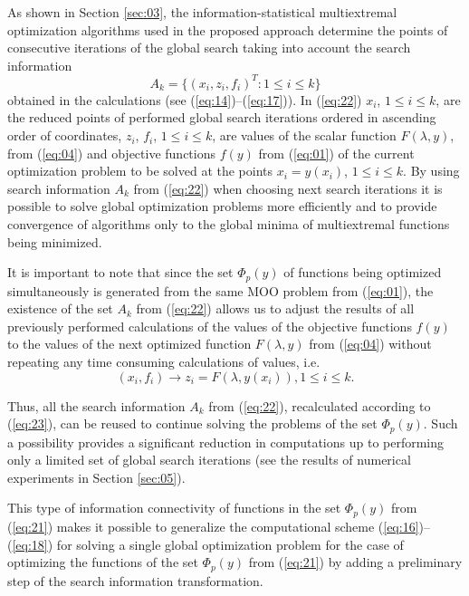 \documentclass[runningheads]{llncs}
\begin{document}
As shown in Section \ref{sec:03}, the information-statistical multiextremal optimization algorithms used in the proposed approach determine the points of consecutive iterations of the global search taking into account the search information
\begin{equation}
\label{eq:22}
A_k=\{(x_i,z_i,f_i )^T:1 \leq i \leq k\}
\end{equation}
obtained in the calculations (see (\ref{eq:14})--(\ref{eq:17})). In (\ref{eq:22}) $x_i$, $1 \leq i \leq k$,  are the reduced points of performed global search iterations ordered in ascending order of coordinates,  $z_i$, $f_i$, $1 \leq i \leq k$, are values of the scalar function $F(\lambda, y)$, from (\ref{eq:04}) and objective functions $f(y)$ from (\ref{eq:01}) of the current optimization problem to be solved at the points $x_i=y(x_i)$, $1 \leq i \leq k$. By using search information $A_k$ from (\ref{eq:22}) when choosing next search iterations it is possible to solve global optimization problems more efficiently and to provide convergence of algorithms only to the global minima of multiextremal functions being minimized.

It is important to note that since the set $\Phi_p(y)$ of functions being optimized  simultaneously is generated from the same MOO problem from (\ref{eq:01}), the existence of the set $A_k$ from (\ref{eq:22}) allows us to adjust the results of all previously performed calculations of the values of the objective functions $f(y)$ to the values of the next optimized function $F(\lambda, y)$ from (\ref{eq:04}) without repeating any time consuming calculations of values, i.e.
\begin{equation}
\label{eq:23}
(x_i,f_i ) \to z_i=F(\lambda, y(x_i)) ,1 \leq i \leq k.
\end{equation}

Thus, all the search information $A_k$ from (\ref{eq:22}), recalculated according to (\ref{eq:23}), can be reused to continue solving the problems of the set $\Phi_p(y)$. Such a possibility provides a significant reduction in computations up to performing only a limited set of global search iterations (see the results of numerical experiments in Section \ref{sec:05}).

     This type of information connectivity of functions in the set $\Phi_p(y)$ from (\ref{eq:21}) makes it possible to generalize the computational scheme (\ref{eq:16})--(\ref{eq:18}) for solving a single global optimization problem for the case of optimizing the functions of the set $\Phi_p(y)$ from (\ref{eq:21}) by adding a preliminary step of the search information  transformation.
\end{document}
